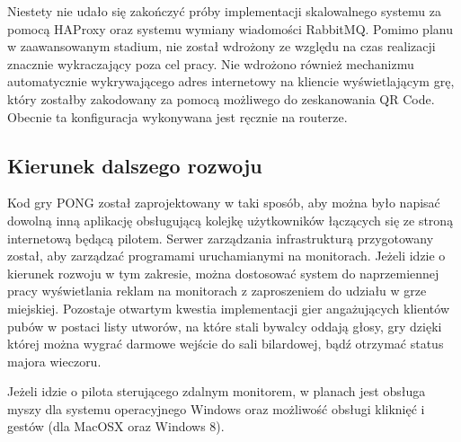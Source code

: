 Niestety nie udało się zakończyć próby implementacji skalowalnego systemu za pomocą HAProxy oraz systemu wymiany wiadomości RabbitMQ. Pomimo planu w zaawansowanym stadium, nie został wdrożony ze względu na czas realizacji znacznie wykraczający poza cel pracy. Nie wdrożono również mechanizmu automatycznie wykrywającego adres internetowy na kliencie wyświetlającym grę, który zostałby zakodowany za pomocą możliwego do zeskanowania QR Code. Obecnie ta konfiguracja wykonywana jest ręcznie na routerze.

\subsection{Kierunek dalszego rozwoju}

Kod gry PONG został zaprojektowany w taki sposób, aby można było napisać dowolną inną aplikację obsługującą kolejkę użytkowników łączących się ze stroną internetową będącą pilotem. Serwer zarządzania infrastrukturą przygotowany został, aby zarządzać programami uruchamianymi na monitorach. Jeżeli idzie o kierunek rozwoju w tym zakresie, można dostosować system do naprzemiennej pracy wyświetlania reklam na monitorach z zaproszeniem do udziału w grze miejskiej. Pozostaje otwartym kwestia implementacji gier angażujących klientów pubów w postaci listy utworów, na które stali bywalcy oddają głosy, gry dzięki której można wygrać darmowe wejście do sali bilardowej, bądź otrzymać status majora wieczoru.

Jeżeli idzie o pilota sterującego zdalnym monitorem, w planach jest obsługa myszy dla systemu operacyjnego Windows oraz możliwość obsługi kliknięć i gestów (dla MacOSX oraz Windows 8).

